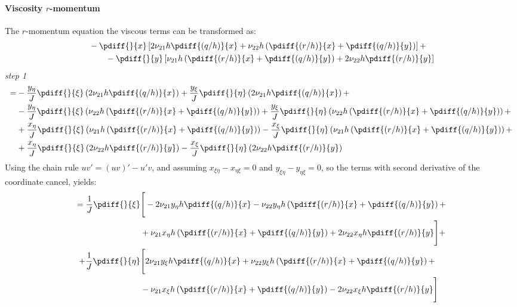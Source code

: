 \paragraph*{Viscosity $r$-momentum}
The $r$-momentum equation the viscous terms can be transformed as:
\begin{align}
    &-\pdiff{}{x} \left[ 2 \nu_{21} h \pdiff{(q/h)}{x} + \nu_{22}  h \left(\pdiff{(r/h)}{x} + \pdiff{(q/h)}{y}\right) \right] +
    \\
    &\qquad
    - \pdiff{}{y} \left[ \nu_{21} h \left(\pdiff{(r/h)}{x} + \pdiff{(q/h)}{y}\right) + 2 \nu_{22} h \pdiff{(r/h)}{y} \right]
\end{align}
\textit{step 1}
\begin{align}
=&
-\frac{y_{\eta}}{J}\pdiff{}{\xi}\left( 2 \nu_{21} h \pdiff{(q/h)}{x} \right)
+ \frac{y_{\xi}}{J} \pdiff{}{\eta}\left( 2 \nu_{21} h \pdiff{(q/h)}{x}\right)
+
\\
&-
\frac{y_{\eta}}{J}\pdiff{}{\xi}\left( \nu_{22}  h \left(\pdiff{(r/h)}{x} + \pdiff{(q/h)}{y}\right) \right)
+ \frac{y_{\xi}}{J} \pdiff{}{\eta}\left( \nu_{22}  h \left(\pdiff{(r/h)}{x} + \pdiff{(q/h)}{y}\right) \right)
+
\\
&+ \frac{x_{\eta}}{J}\pdiff{}{\xi}\left( \nu_{21} h \left(\pdiff{(r/h)}{x} + \pdiff{(q/h)}{y}\right) \right)
- \frac{x_{\xi}}{J} \pdiff{}{\eta}\left( \nu_{21} h \left(\pdiff{(r/h)}{x} + \pdiff{(q/h)}{y}\right) \right)
+
\\
&+ \frac{x_{\eta}}{J}\pdiff{}{\xi}\left( 2 \nu_{22} h \pdiff{(r/h)}{y} \right)
- \frac{x_{\xi}}{J} \pdiff{}{\eta}\left( 2 \nu_{22} h \pdiff{(r/h)}{y} \right)
\end{align}
Using the chain rule $uv' = (uv)' - u'v$, and assuming $x_{\xi\eta} - x_{\eta\xi} = 0$ and $y_{\xi\eta} - y_{\eta\xi} = 0$, so the terms with second derivative of the coordinate cancel, yields:
\begin{align}
    =
    \frac{1}{J} \pdiff{}{\xi} & \Bigg[
    -2\nu_{21} y_{\eta} h\pdiff{(q/h)}{x}
    - \nu_{22} y_{\eta} h \left(\pdiff{(r/h)}{x} + \pdiff{(q/h)}{y}\right)
    +
    \\*
    &
    + \nu_{21} x_\eta h \left(\pdiff{(r/h)}{x} + \pdiff{(q/h)}{y} \right)
    + 2 \nu_{22} x_{\eta} h \pdiff{(r/h)}{y}
    \Bigg] +
    \\
    + \frac{1}{J} \pdiff{}{\eta} & \Bigg[ 2\nu_{21} y_{\xi} h \pdiff{(q/h)}{x}
    + \nu_{22} y_{\xi} h \left(\pdiff{(r/h)}{x} + \pdiff{(q/h)}{y}\right) +
    \\*
    &
    -  \nu_{21} x_\xi h \left(\pdiff{(r/h)}{x} + \pdiff{(q/h)}{y}\right)
    -  2 \nu_{22} x_{\xi} h \pdiff{(r/h)}{y}
    \Bigg]
\end{align}
